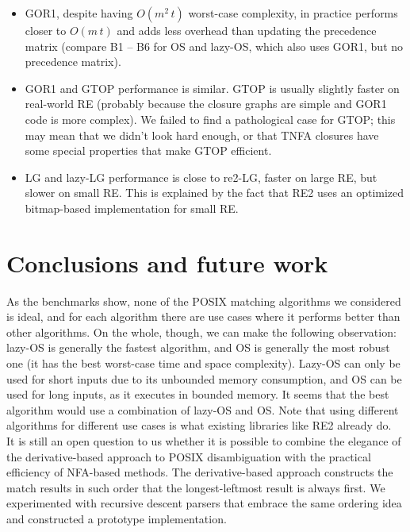 \documentclass[AMA,STIX1COL]{WileyNJD-v2}
\begin{document}
\begin{itemize}[itemsep=0.2em, topsep=0.5em]
\item GOR1, despite having $O(m^2 \, t)$ worst-case complexity,
    in practice performs closer to $O(m \, t)$
    and adds less overhead than updating the precedence matrix
    (compare B1 -- B6 for OS and lazy-OS, which also uses GOR1, but no precedence matrix).

\item GOR1 and GTOP performance is similar.
    GTOP is usually slightly faster on real-world RE (probably because the closure graphs are simple and GOR1 code is more complex).
    We failed to find a pathological case for GTOP;
    this may mean that we didn't look hard enough,
    or that TNFA closures have some special properties that make GTOP efficient.

\item LG and lazy-LG performance is close to re2-LG, faster on large RE, but slower on small RE.
    This is explained by the fact that RE2 uses an optimized bitmap-based implementation for small RE.
\end{itemize}

\FloatBarrier


\section{Conclusions and future work}\label{section_conclusions}

As the benchmarks show,
none of the POSIX matching algorithms we considered is ideal,
and for each algorithm there are use cases where it performs better than other algorithms.
On the whole, though, we can make the following observation:
lazy-OS is generally the fastest algorithm,
and OS is generally the most robust one (it has the best worst-case time and space complexity).
Lazy-OS can only be used for short inputs due to its unbounded memory consumption,
and OS can be used for long inputs, as it executes in bounded memory.
It seems that the best algorithm would use a combination of lazy-OS and OS.
Note that using different algorithms for different use cases is what existing libraries like RE2 already do.
\\

It is still an open question to us
whether it is possible to combine the elegance of the derivative-based approach to POSIX disambiguation
with the practical efficiency of NFA-based methods.
%
The derivative-based approach constructs the match results in such order that the longest-leftmost result is always first.
%
We experimented with recursive descent parsers that embrace the same ordering idea
and constructed a prototype implementation.
\\
\end{document}
